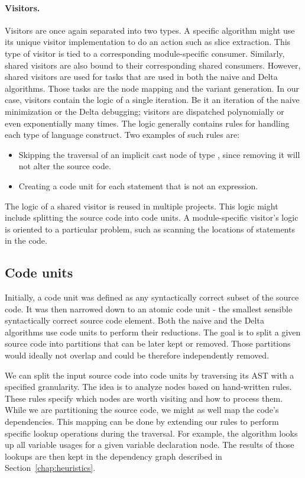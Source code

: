 \paragraph{Visitors.} Visitors are once again separated into two types. 
A specific algorithm might use its unique visitor implementation to do 
an action such as slice extraction. 
This type of visitor is tied to a corresponding module-specific consumer. 
Similarly, shared visitors are also bound to their corresponding shared 
consumers. 
However, shared visitors are used for tasks that are used in both the naive 
and Delta algorithms. 
Those tasks are the node mapping and the variant generation. 
In our case, visitors contain the logic of a single iteration. 
Be it an iteration of the naive minimization or the Delta debugging; 
visitors are dispatched polynomially or even exponentially many times. 
The logic generally contains rules for handling each type of language 
construct. 
Two examples of such rules are:
\begin{itemize}
  \item Skipping the traversal of an implicit cast node of type 
  , since removing it will not alter the source code.
  \item Creating a code unit for each statement that is not an expression.
\end{itemize}
The logic of a shared visitor is reused in multiple projects. 
This logic might include splitting the source code into code units. 
A module-specific visitor's logic is oriented to a particular problem, 
such as scanning the locations of statements in the code.

\subsection{Code units}\label{chap:codeunits}

Initially, a code unit was defined as any syntactically correct subset of 
the source code. 
It was then narrowed down to an atomic code unit - the smallest sensible 
syntactically correct source code element. 
Both the naive and the Delta algorithms use code units to perform their 
reductions. 
The goal is to split a given source code into partitions that can be later 
kept or removed. 
Those partitions would ideally not overlap and could be therefore 
independently removed.

We can split the input source code into code units by traversing its AST 
with a specified granularity. 
The idea is to analyze nodes based on hand-written rules. 
These rules specify which nodes are worth visiting and how to process them. 
While we are partitioning the source code, we might as well map the code's 
dependencies. 
This mapping can be done by extending our rules to perform specific lookup 
operations during the traversal. 
For example, the algorithm looks up all variable usages for a given variable 
declaration node. 
The results of those lookups are then kept in the dependency graph described 
in Section~\ref{chap:heuristics}.

